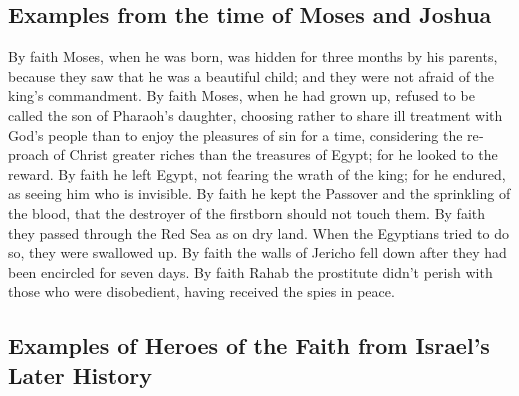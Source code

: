 \begin{paracol}{2}
\begin{otherlanguage}{english}
\hypertarget{examples-from-the-time-of-moses-and-joshua}{%
\subsection{Examples from the time of Moses and
Joshua}\label{examples-from-the-time-of-moses-and-joshua}}

 By faith Moses, when he was born, was hidden for three
months by his parents, because they saw that he was a beautiful child;
and they were not afraid of the king's commandment.  By
faith Moses, when he had grown up, refused to be called the son of
Pharaoh's daughter,  choosing rather to share ill
treatment with God's people than to enjoy the pleasures of sin for a
time,  considering the reproach of Christ greater riches
than the treasures of Egypt; for he looked to the reward.
 By faith he left Egypt, not fearing the wrath of the
king; for he endured, as seeing him who is invisible.  By
faith he kept the Passover and the sprinkling of the blood, that the
destroyer of the firstborn should not touch them.  By
faith they passed through the Red Sea as on dry land. When the Egyptians
tried to do so, they were swallowed up.  By faith the
walls of Jericho fell down after they had been encircled for seven days.
 By faith Rahab the prostitute didn't perish with those
who were disobedient, having received the spies in peace.

\hypertarget{examples-of-heroes-of-the-faith-from-israels-later-history}{%
\subsection{Examples of Heroes of the Faith from Israel's Later
History}\label{examples-of-heroes-of-the-faith-from-israels-later-history}}


\end{otherlanguage}
\end{paracol}
